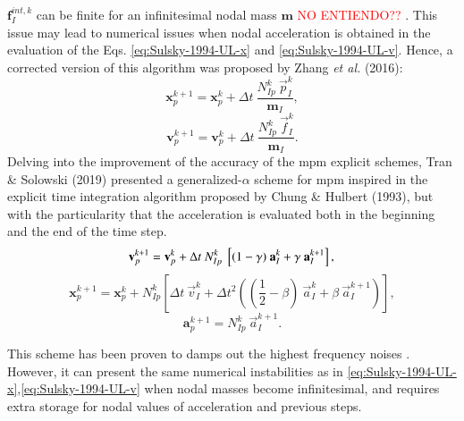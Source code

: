 \documentclass[preprint,12pt,a4paper]{elsarticle}
\newcommand{\vect}[1]{
  \ensuremath{\mathbf{{#1}}}
}
\newcommand{\tens}[1]{
  \ensuremath{\mathbf{{#1}}}
}
\newcommand{\red}[1]{
  \textcolor{red}{{#1}}
}
\begin{document}
$\vect{f}_I^{int,k}$ can be finite for an infinitesimal nodal mass
$\tens{m}$\red{NO ENTIENDO??}. This issue may lead to numerical issues when nodal acceleration
is obtained in the evaluation of the Eqs. \eqref{eq:Sulsky-1994-UL-x} and \eqref{eq:Sulsky-1994-UL-v}. Hence, a
corrected version of this algorithm was proposed by Zhang {\it et al.}
(2016)\cite{Zhang_book_2016}:
\begin{equation}
  \label{eq:Zhang-2016-UL-x}
  \vect{x}_p^{k+1} = \vect{x}_p^{k} + \Delta t\ \frac{N_{Ip}^{k}\ \vec{p}_{I}^{k}}{\tens{m}_I}, 
\end{equation}
\begin{equation}
  \label{eq:Zhang-2016-UL-v}
  \vect{v}_p^{k+1} = \vect{v}_p^{k} + \Delta t\ \frac{N_{Ip}^{k}\ \vec{f}_{I}^{k}}{\tens{m}_I}.
\end{equation}
Delving into the improvement of the accuracy of the \acrshort{mpm} explicit schemes, Tran \& Solowski (2019)\cite{Tran2019e} presented a
generalized-$\alpha$ scheme for \acrshort{mpm} inspired in the explicit time
integration algorithm proposed by Chung \& Hulbert
(1993)\cite{Geranlized_alpha_1993}, but with the particularity that
the acceleration is evaluated both in the beginning and the end of the
time step.
\begin{equation}
  \label{eq:Tran-2019-GA-v}
  \vect{v}_p^{k+1} = \vect{v}_p^{k} + \Delta t\  N_{Ip}^{k}\ \left[(1 - \gamma)\ \vect{a}_I^{k} +
    \gamma\ \vect{a}_I^{k+1} \right],\\
\end{equation}
\begin{equation}
\label{eq:Tran-2019-GA-x}
  \vect{x}_p^{k+1} = \vect{x}_p^{k} + N_{Ip}^{k} \left[ \Delta t\ \vec{v}_{I}^{k}+ \Delta t^2\left( (\frac{1}{2} - \beta)\
    \vec{a}_{I}^{k} + \beta\ \vec{a}_{I}^{k+1} \right) \right],
\end{equation}
\begin{equation}
  \label{eq:Tran-2019-GA-a}
  \vect{a}_p^{k+1} = N_{Ip}^{k}\ \vec{a}_{I}^{k+1}.
\end{equation}

This scheme has been proven to damps out the highest frequency noises
\cite{Tran2019e}. However, it can present the same numerical instabilities
as in \eqref{eq:Sulsky-1994-UL-x},\eqref{eq:Sulsky-1994-UL-v} when
nodal masses become infinitesimal, and requires extra storage for
nodal values of acceleration and previous steps.
\end{document}
